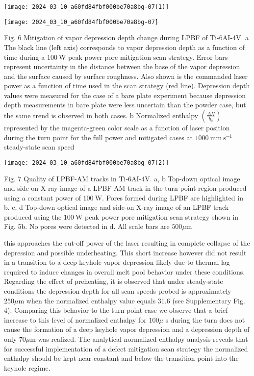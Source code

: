 \documentclass[10pt]{article}
\begin{document}
\begin{center}
\texttt{[image: 2024\_03\_10\_a60fd84fbf000be70a8bg-07(1)]}
\end{center}

\begin{center}
\texttt{[image: 2024\_03\_10\_a60fd84fbf000be70a8bg-07]}
\end{center}

Fig. 6 Mitigation of vapor depression depth change during LPBF of Ti-6AI-4V. a The black line (left axis) corresponds to vapor depression depth as a function of time during a $100 \mathrm{~W}$ peak power pore mitigation scan strategy. Error bars represent uncertainty in the distance between the base of the vapor depression and the surface caused by surface roughness. Also shown is the commanded laser power as a function of time used in the scan strategy (red line). Depression depth values were measured for the case of a bare plate experiment because depression depth measurements in bare plate were less uncertain than the powder case, but the same trend is observed in both cases. b Normalized enthalpy $\left(\frac{\Delta H}{h_{\mathrm{s}}}\right)$ represented by the magenta-green color scale as a function of laser position during the turn point for the full power and mitigated cases at $1000 \mathrm{~mm} \mathrm{~s}^{-1}$ steady-state scan speed

\begin{center}
\texttt{[image: 2024\_03\_10\_a60fd84fbf000be70a8bg-07(2)]}
\end{center}

Fig. 7 Quality of LPBF-AM tracks in Ti-6AI-4V. a, b Top-down optical image and side-on X-ray image of a LPBF-AM track in the turn point region produced using a constant power of $100 \mathrm{~W}$. Pores formed during LPBF are highlighted in b. c, d Top-down optical image and side-on X-ray image of an LPBF track produced using the $100 \mathrm{~W}$ peak power pore mitigation scan strategy shown in Fig. 5b. No pores were detected in d. All scale bars are $500 \mu \mathrm{m}$

this approaches the cut-off power of the laser resulting in complete collapse of the depression and possible underheating. This short increase however did not result in a transition to a deep keyhole vapor depression likely due to thermal lag required to induce changes in overall melt pool behavior under these conditions. Regarding the effect of preheating, it is observed that under steady-state conditions the depression depth for all scan speeds probed is approximately $250 \mu \mathrm{m}$ when the normalized enthalpy value equals 31.6 (see Supplementary Fig. 4). Comparing this behavior to the turn point case we observe that a brief increase to this level of normalized enthalpy for $100 \mu$ s during the turn does not cause the formation of a deep keyhole vapor depression and a depression depth of only $70 \mu \mathrm{m}$ was realized. The analytical normalized enthalpy analysis reveals that for successful implementation of a defect mitigation scan strategy the normalized enthalpy should be kept near constant and below the transition point into the keyhole regime.
\end{document}
